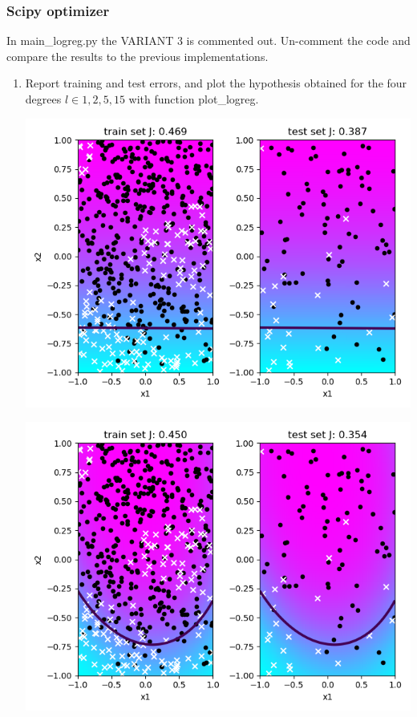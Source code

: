 \documentclass[a4paper]{article}
\begin{document}
\subsubsection{ Scipy optimizer}
In main\_logreg.py the VARIANT 3 is commented out. Un-comment the code and compare the results to the previous implementations.
\begin{enumerate}
\item Report training and test errors, and plot the hypothesis obtained for the four degrees $l \in {1, 2, 5, 15}$ with function plot\_logreg.\\

\begin{minipage}[b]{0.4\textwidth}
  \vspace{10pt}
  \includegraphics[scale=0.35]{plots/scipy_gradient_descent_1_1_1000.png}
 \captionsetup{justification=centering}
  \label{scipy_gradient_descent_1_1_1000}
\end{minipage}
\hfill
\begin{minipage}[b]{0.4\textwidth}
  \includegraphics[scale=0.35]{plots/scipy_gradient_descent_2_1_1000.png}

\end{minipage}
\end{enumerate}
\end{document}
